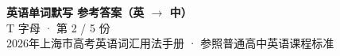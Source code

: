 \documentclass[10pt,a4paper]{article}
\begin{document}
\pagestyle{plain}

\begin{center}
{\LARGE\bfseries 英语单词默写 \quad 参考答案（英 $\to$ 中）}\\[0.22em]
{\large T 字母 · 第 2 / 5 份}\\[0.18em]
{\small 2026年上海市高考英语词汇用法手册 · 参照普通高中英语课程标准}
\end{center}

\vspace{0.2em}
\noindent{\color{rulegray}\rule{\textwidth}{0.8pt}}

\vspace{0.35em}

\vspace{0.25em}
\renewcommand{\arraystretch}{1.32}
\end{document}
